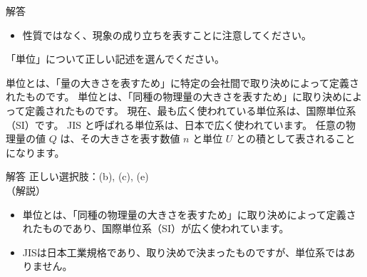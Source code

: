 \documentclass[uplatex,dvipdfmx,a4paper,11pt]{jsarticle}
\begin{document}
\begin{qlist}
\begin{itembox}[l]{解答}
\begin{itemize}
          \item 性質ではなく、現象の成り立ちを表すことに注意してください。
        \end{itemize}
    \end{itembox}
	\qitem 「単位」について正しい記述を選んでください。
		\begin{qlist2}
			\qitem 単位とは、「量の大きさを表すため」に特定の会社間で取り決めによって定義されたものです。
			\qitem 単位とは、「同種の物理量の大きさを表すため」に取り決めによって定義されたものです。
			\qitem 現在、最も広く使われている単位系は、国際単位系（SI）です。
			\qitem JIS と呼ばれる単位系は、日本で広く使われています。
			\qitem 任意の物理量の値 $Q$ は、その大きさを表す数値 $n$ と単位 $U$ との積として表されることになります。
		\end{qlist2}
    \vspace{3mm}
    \begin{itembox}[l]{解答}
        正しい選択肢：(b), (c), (e)\\
        （解説）
        \begin{itemize}
          \item 単位とは、「同種の物理量の大きさを表すため」に取り決めによって定義されたものであり、国際単位系（SI）が広く使われています。
          \item JISは日本工業規格であり、取り決めで決まったものですが、単位系ではありません。
        \end{itemize}
    \end{itembox}
\end{qlist}
\end{document}
